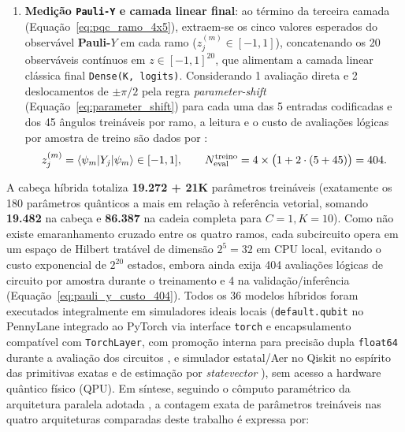 \documentclass[
    12pt,
    openright,
    oneside,
    a4paper,
    english,
    brazil
]{abntex2}
\begin{document}
\begin{enumerate}
\begin{equation}
    \bigotimes_{j=1}^{5} R_X\!\left(u_j^{(m)}\right)
    \right]
    \ket{0}^{\otimes 5};
    \end{equation}
    \item \textbf{Medição \texttt{Pauli-Y} e camada linear final}: ao término da terceira camada (Equação~\eqref{eq:pqc_ramo_4x5}), extraem-se os cinco valores esperados do observável \textbf{Pauli-\(Y\)} em cada ramo (\(z^{(m)}_j \in [-1, 1]\)), concatenando os 20 observáveis contínuos em \(z \in [-1, 1]^{20}\), que alimentam a camada linear clássica final \texttt{Dense(K, logits)}. Considerando 1 avaliação direta e 2 deslocamentos de \(\pm\pi/2\) pela regra \textit{parameter-shift} (Equação~\eqref{eq:parameter_shift}) para cada uma das 5 entradas codificadas e dos 45 ângulos treináveis por ramo, a leitura e o custo de avaliações lógicas por amostra de treino são dados por \cite{senokosov2024qml,cerezo2021variational,bergholm2018pennylane}:
    \begin{equation}
    \label{eq:pauli_y_custo_404}
    z_j^{(m)} = \braket{\psi_m | Y_j | \psi_m} \in [-1, 1],
    \qquad
    N_{\text{eval}}^{\text{treino}} = 4 \times \bigl(1 + 2 \cdot (5 + 45)\bigr) = 404.
    \end{equation}
\end{enumerate}

A cabeça híbrida totaliza \textbf{19.272 + 21K} parâmetros treináveis (exatamente os 180 parâmetros quânticos a mais em relação à referência vetorial, somando \textbf{19.482} na cabeça e \textbf{86.387} na cadeia completa para \(C=1, K=10\)). Como não existe emaranhamento cruzado entre os quatro ramos, cada subcircuito opera em um espaço de Hilbert tratável de dimensão \(2^5 = 32\) em CPU local, evitando o custo exponencial de \(2^{20}\) estados, embora ainda exija 404 avaliações lógicas de circuito por amostra durante o treinamento e 4 na validação/inferência (Equação~\eqref{eq:pauli_y_custo_404}). Todos os 36 modelos híbridos foram executados integralmente em simuladores ideais locais (\texttt{default.qubit} no PennyLane integrado ao PyTorch via interface \texttt{torch} e encapsulamento compatível com \texttt{TorchLayer}, com promoção interna para precisão dupla \texttt{float64} durante a avaliação dos circuitos \cite{bergholm2018pennylane,pennylaneDocsTorch2026}, e simulador estatal/Aer no Qiskit no espírito das primitivas exatas e de estimação por \textit{statevector} \cite{javadiabhari2024qiskit,ibmQuantumAerSimulation2026,ibmQuantumPrimitives2026}), sem acesso a hardware quântico físico (QPU). Em síntese, seguindo o cômputo paramétrico da arquitetura paralela adotada \cite{senokosov2024qml}, a contagem exata de parâmetros treináveis nas quatro arquiteturas comparadas deste trabalho é expressa por:
\end{document}
